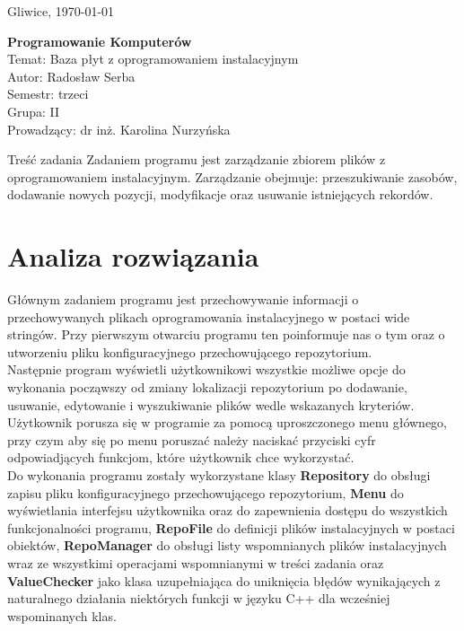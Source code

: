 \documentclass[10pt, a4paper]{article}
\newcommand{\KNDate}[1]{#1, \today}
\newcommand{\KNPrzedmiot}[1]{\textbf{#1}}
\newcommand{\KNTemat}[1]{Temat: #1}
\newcommand{\KNSemestr}[1]{Semestr: #1}
\newcommand{\KNGrupa}[1]{Grupa: #1}
\newcommand{\KNAutor}[1]{Autor: #1}
\newcommand{\KNProwadzacy}[1]{Prowadzący: #1}
\newcommand{\KNNaglowek}[8]
{
	\newpage
	\begin{center}
		{
			\thispagestyle{empty}	
			\raggedleft \KNDate{#1}
					
			\vspace{5cm}	
			\centering
			\Huge \KNPrzedmiot{#2}\\
			\vspace{1cm}	
			\LARGE \KNTemat{#3} \\
			
			\vspace{15cm}
			\normalsize
			\raggedleft
			\KNAutor{#5}\\
			\KNSemestr{#6}\\
			\KNGrupa{#7}\\
			\vspace{1cm}
			\KNProwadzacy{#4}\\

		
			\newpage	
		} 
	\end{center}
}
\begin{document}
	
\KNNaglowek{Gliwice}
           {Programowanie Komputerów}
           {Baza płyt z oprogramowaniem instalacyjnym}
           {dr inż. Karolina Nurzyńska}
           {Radosław Serba}
           {trzeci}
           {II}
           

\section{Treść zadania} 
Zadaniem programu jest zarządzanie zbiorem plików z oprogramowaniem instalacyjnym. Zarządzanie obejmuje: przeszukiwanie zasobów, dodawanie nowych pozycji, modyfikacje oraz usuwanie istniejących rekordów.
\section{Analiza rozwiązania}
Głównym zadaniem programu jest przechowywanie informacji o przechowywanych plikach oprogramowania instalacyjnego w postaci wide stringów. Przy pierwszym otwarciu programu ten poinformuje nas o tym oraz o utworzeniu pliku konfiguracyjnego przechowującego repozytorium.\\

Następnie program wyświetli użytkownikowi wszystkie możliwe opcje do wykonania począwszy od zmiany lokalizacji repozytorium po dodawanie, usuwanie, edytowanie i wyszukiwanie plików wedle wskazanych kryteriów. Użytkownik porusza się w programie za pomocą uproszczonego menu głównego, przy czym aby się po menu poruszać należy naciskać przyciski cyfr odpowiadjących funkcjom, które użytkownik chce wykorzystać.\\

Do wykonania programu zostały wykorzystane klasy \textbf{Repository} do obsługi zapisu pliku konfiguracyjnego przechowującego repozytorium, \textbf{Menu} do wyświetlania interfejsu użytkownika oraz do zapewnienia dostępu do wszystkich funkcjonalności programu, \textbf{RepoFile} do definicji plików instalacyjnych w postaci obiektów, \textbf{RepoManager} do obsługi listy wspomnianych plików instalacyjnych wraz ze wszystkimi operacjami wspomnianymi w treści zadania oraz \textbf{ValueChecker} jako klasa uzupełniająca do uniknięcia błędów wynikających z naturalnego działania niektórych funkcji w języku C++ dla wcześniej wspominanych klas.
\end{document}
